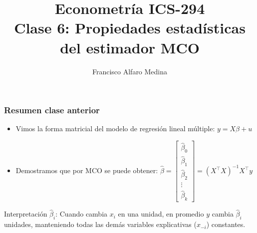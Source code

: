 \documentclass{beamer}
\title[ICS-162]{Econometría ICS-294\\ \small{Clase 6: Propiedades estadísticas del estimador MCO}}
\author{Francisco Alfaro Medina}
\institute[USM]
{Universidad Técnica Federico Santa María\\ %
	\medskip
	\textit{} %
	
}
\date{}
\begin{document}
	
\begin{frame}
	\titlepage %


\end{frame}

\begin{frame}[shrink=10]

\frametitle{Resumen clase anterior}

\begin{itemize}
    \item Vimos la forma matricial del modelo de regresión lineal múltiple: $y = X\beta + u$
    \item Demostramos que por MCO se puede obtener: $\hat{\beta} = \begin{bmatrix} \hat{\beta}_0 \\ \hat{\beta}_1 \\ \hat{\beta}_2 \\ \vdots \\ \hat{\beta}_k \end{bmatrix} = (X^\top X)^{-1}X^\top y$
\end{itemize}

Interpretación $\hat{\beta}_i$: Cuando cambia $x_i$ en una unidad, en promedio $y$ cambia $\hat{\beta}_i$ unidades, manteniendo todas las demás variables explicativas  ($x_{-i}$) constantes.

\end{frame}
\end{document}
